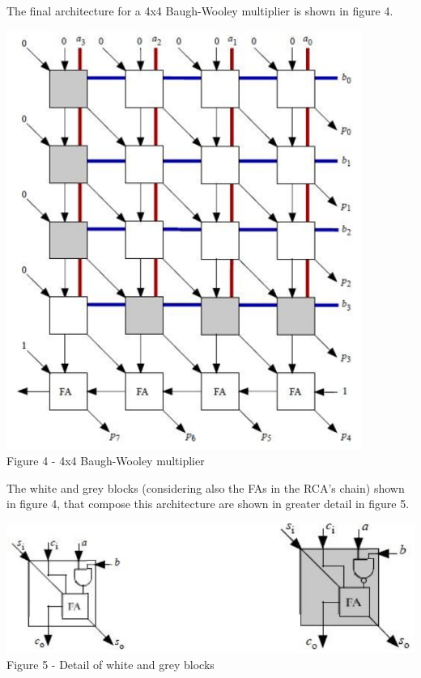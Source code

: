 \documentclass[11pt]{article} %
\begin{document}
\vspace{1em}
The final architecture for a 4x4 Baugh-Wooley multiplier is shown in figure 4.
\vspace{1em}
\begin{center}
\includegraphics[scale=.54]{bwm.PNG}\\
\small{Figure 4 - 4x4 Baugh-Wooley multiplier}\\
\end{center}
\vspace{1em}
The white and grey blocks (considering also the FAs in the RCA’s chain) shown in figure 4, that compose this architecture are shown in greater detail in figure 5.
\begin{center}
\includegraphics[scale=.48]{wgblocks.PNG}\\
\small{Figure 5 - Detail of white and grey blocks}\\
\end{center}
\end{document}
